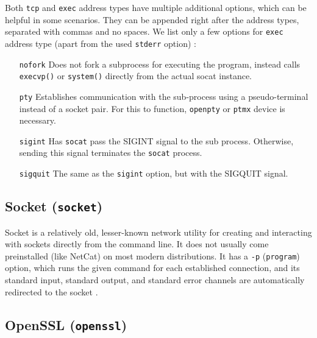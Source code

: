 Both \texttt{tcp} and \texttt{exec} address types have multiple additional options, which can be helpful in some scenarios. They can be appended right after the address types, separated with commas and no spaces. We list only a few options for \texttt{exec} address type (apart from the used \texttt{stderr} option) \cite{socat-man}:

\setlength{\leftmargini}{5em}
\begin{itemize}
\item[\texttt{nofork}] Does not fork a subprocess for executing the program, instead calls \texttt{execvp()} or \texttt{system()} directly from the actual socat instance.
\item[\texttt{pty}] Establishes communication with the sub-process using a pseudo-terminal instead of a socket pair. For this to function, \texttt{openpty} or \texttt{ptmx} device is necessary.
\item[\texttt{sigint}] Has \texttt{socat} pass the SIGINT signal to the sub process. Otherwise, sending this signal terminates the \texttt{socat} process.
\item[\texttt{sigquit}] The same as the \texttt{sigint} option, but with the SIGQUIT signal.
\end{itemize}
\setlength{\leftmargini}{2.5em}


\subsection{Socket (\texttt{socket})}


Socket is a relatively old, lesser-known network utility for creating and interacting with sockets directly from the command line. It does not usually come preinstalled (like NetCat) on most modern distributions. It has a \texttt{-p} (\texttt{program}) option, which runs the given command for each established connection, and its standard input, standard output, and standard error channels are automatically redirected to the socket \cite{socket-man}.




\subsection{OpenSSL (\texttt{openssl})}

